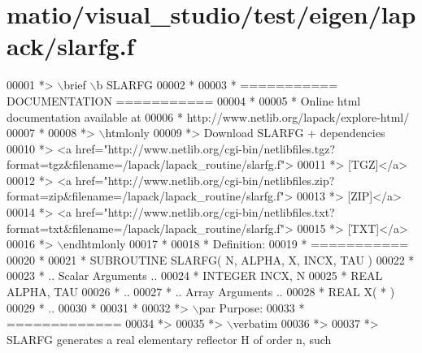 \hypertarget{matio_2visual__studio_2test_2eigen_2lapack_2slarfg_8f_source}{}\section{matio/visual\+\_\+studio/test/eigen/lapack/slarfg.f}
\label{matio_2visual__studio_2test_2eigen_2lapack_2slarfg_8f_source}

\begin{DoxyCode}
00001 \textcolor{comment}{*> \(\backslash\)brief \(\backslash\)b SLARFG}
00002 \textcolor{comment}{*}
00003 \textcolor{comment}{*  =========== DOCUMENTATION ===========}
00004 \textcolor{comment}{*}
00005 \textcolor{comment}{* Online html documentation available at }
00006 \textcolor{comment}{*            http://www.netlib.org/lapack/explore-html/ }
00007 \textcolor{comment}{*}
00008 \textcolor{comment}{*> \(\backslash\)htmlonly}
00009 \textcolor{comment}{*> Download SLARFG + dependencies }
00010 \textcolor{comment}{*> <a
       href="http://www.netlib.org/cgi-bin/netlibfiles.tgz?format=tgz&filename=/lapack/lapack\_routine/slarfg.f"> }
00011 \textcolor{comment}{*> [TGZ]</a> }
00012 \textcolor{comment}{*> <a
       href="http://www.netlib.org/cgi-bin/netlibfiles.zip?format=zip&filename=/lapack/lapack\_routine/slarfg.f"> }
00013 \textcolor{comment}{*> [ZIP]</a> }
00014 \textcolor{comment}{*> <a
       href="http://www.netlib.org/cgi-bin/netlibfiles.txt?format=txt&filename=/lapack/lapack\_routine/slarfg.f"> }
00015 \textcolor{comment}{*> [TXT]</a>}
00016 \textcolor{comment}{*> \(\backslash\)endhtmlonly }
00017 \textcolor{comment}{*}
00018 \textcolor{comment}{*  Definition:}
00019 \textcolor{comment}{*  ===========}
00020 \textcolor{comment}{*}
00021 \textcolor{comment}{*       SUBROUTINE SLARFG( N, ALPHA, X, INCX, TAU )}
00022 \textcolor{comment}{* }
00023 \textcolor{comment}{*       .. Scalar Arguments ..}
00024 \textcolor{comment}{*       INTEGER            INCX, N}
00025 \textcolor{comment}{*       REAL               ALPHA, TAU}
00026 \textcolor{comment}{*       ..}
00027 \textcolor{comment}{*       .. Array Arguments ..}
00028 \textcolor{comment}{*       REAL               X( * )}
00029 \textcolor{comment}{*       ..}
00030 \textcolor{comment}{*  }
00031 \textcolor{comment}{*}
00032 \textcolor{comment}{*> \(\backslash\)par Purpose:}
00033 \textcolor{comment}{*  =============}
00034 \textcolor{comment}{*>}
00035 \textcolor{comment}{*> \(\backslash\)verbatim}
00036 \textcolor{comment}{*>}
00037 \textcolor{comment}{*> SLARFG generates a real elementary reflector H of order n, such}

\end{DoxyCode}
